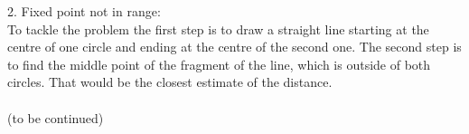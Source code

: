 2. Fixed point not in range: \\
To tackle the problem the first step is to draw a straight line starting at the centre of one circle and ending at the centre of the second one. The second step is to find the middle point of the fragment of the line, which is outside of both circles. That would be the closest estimate of the distance.\\\\
(to be continued)





	






